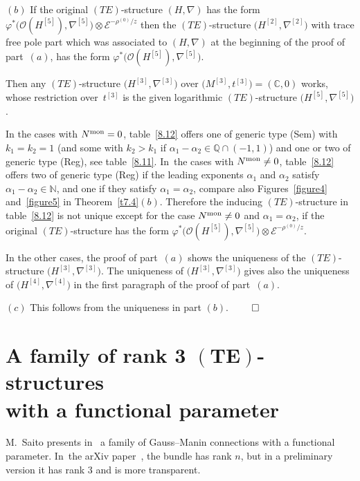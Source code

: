 \documentclass[10pt,a4paper]{amsart}
\numberwithin{equation}{section}
\numberwithin{figure}{section}
\newcommand{\N}{{\mathbb N}}
\newcommand{\Q}{{\mathbb Q}}
\newcommand{\C}{{\mathbb C}}
\newcommand{\EE}{{\mathcal E}}
\newcommand{\OO}{{\mathcal O}}
\newcommand{\nnn}{\nabla}
\begin{document}
\medskip
$(b)$ If the original $(TE)$-structure $(H,\nnn)$ has
the form
$\varphi^*\big(\OO(H^{[5]}),\nnn^{[5]}\big)\otimes\EE^{-\rho^{(0)}/z}$
then the $(TE)$-structure $\big(H^{[2]},\nnn^{[2]}\big)$
with trace free pole part which was associated to
$(H,\nnn)$ at the beginning of the proof of part~$(a)$,
has the form $\varphi^*\big(\OO(H^{[5]}),\nnn^{[5]}\big)$.

Then any $(TE)$-structure $\big(H^{[3]},\nnn^{[3]}\big)$
over $\big(M^{[3]},t^{[3]}\big)=(\C,0)$ works, whose restriction
over~$t^{[3]}$ is the given logarithmic $(TE)$-structure
$\big(H^{[5]},\nnn^{[5]}\big)$.

In the cases with $N^{\rm mon}=0$, table~\eqref{8.12} offers
one of generic type (Sem) with $k_1=k_2=1$
(and some with $k_2>k_1$ if $\alpha_1-\alpha_2\in\Q\cap (-1,1)$)
and one or two of generic type (Reg), see table~\eqref{8.11}. In~the cases with $N^{\rm mon}\neq 0$, table~\eqref{8.12}
offers two of generic type (Reg) if the leading exponents
$\alpha_1$ and $\alpha_2$ satisfy $\alpha_1-\alpha_2\in\N$,
and one if they satisfy $\alpha_1=\alpha_2$,
compare also Figures~\ref{figure4} and~\ref{figure5} in Theorem~\ref{t7.4}$(b)$.
Therefore the inducing $(TE)$-structure in table~\eqref{8.12}
is not unique except for the case $N^{\rm mon}\neq 0$ and
$\alpha_1=\alpha_2$,
if the original $(TE)$-structure has the form
$\varphi^*\big(\OO(H^{[5]}),\nnn^{[5]}\big)\otimes\EE^{-\rho^{(0)}/z}$.

{\sloppy
In the other cases, the proof of part~$(a)$ shows the
uniqueness of the $(TE)$-structure $\big(H^{[3]},\nnn^{[3]}\big)$.
The uniqueness of $\big(H^{[3]},\nnn^{[3]}\big)$
gives also the uniqueness of $\big(H^{[4]},\nnn^{[4]}\big)$
in the first paragraph of the proof of part~$(a)$.

}

\medskip
$(c)$ This follows from the uniqueness in part $(b)$.
\hfill$\qed$

\section[A family of rank 3 $(TE)$-structures with a functional parameter]
{A family of rank 3 $\boldsymbol{(TE)}$-structures\\ with a functional parameter}\label{c9}

M.~Saito presents in~\cite{SaM17} a family of
Gauss--Manin connections with a functional parameter. In~the arXiv paper~\cite{SaM17}, the bundle has rank
$n$, but in a preliminary version
it has rank 3 and is more transparent.
\end{document}
